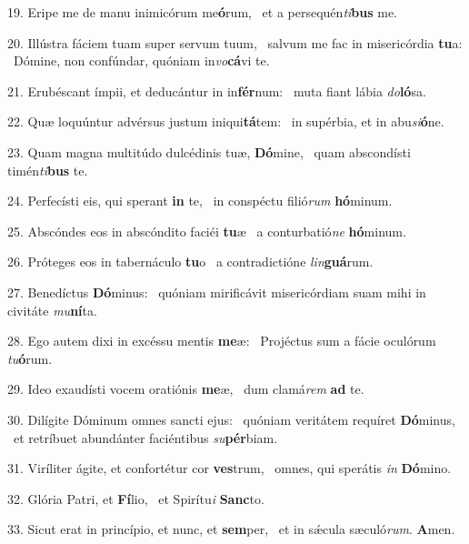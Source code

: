 19. Eripe me de manu inimicórum me\textbf{ó}rum, \ast\  et a persequén\textit{ti}\textbf{bus} me.\

20. Illústra fáciem tuam super servum tuum, \dag\  salvum me fac in misericórdia \textbf{tu}a: \ast\  Dómine, non confúndar, quóniam in\textit{vo}\textbf{cá}vi te.\

21. Erubéscant ímpii, et deducántur in in\textbf{fér}num: \ast\  muta fiant lábia \textit{do}\textbf{ló}sa.\

22. Quæ loquúntur advérsus justum iniqui\textbf{tá}tem: \ast\  in supérbia, et in abu\textit{si}\textbf{ó}ne.\

23. Quam magna multitúdo dulcédinis tuæ, \textbf{Dó}mine, \ast\  quam abscondísti timén\textit{ti}\textbf{bus} te.\

24. Perfecísti eis, qui sperant \textbf{in} te, \ast\  in conspéctu filió\textit{rum} \textbf{hó}minum.\

25. Abscóndes eos in abscóndito faciéi \textbf{tu}æ \ast\  a conturbatió\textit{ne} \textbf{hó}minum.\

26. Próteges eos in tabernáculo \textbf{tu}o \ast\  a contradictióne \textit{lin}\textbf{guá}rum.\

27. Benedíctus \textbf{Dó}minus: \ast\  quóniam mirificávit misericórdiam suam mihi in civitáte \textit{mu}\textbf{ní}ta.\

28. Ego autem dixi in excéssu mentis \textbf{me}æ: \ast\  Projéctus sum a fácie oculórum \textit{tu}\textbf{ó}rum.\

29. Ideo exaudísti vocem oratiónis \textbf{me}æ, \ast\  dum clamá\textit{rem} \textbf{ad} te.\

30. Dilígite Dóminum omnes sancti ejus: \dag\  quóniam veritátem requíret \textbf{Dó}minus, \ast\  et retríbuet abundánter faciéntibus \textit{su}\textbf{pér}biam.\

31. Viríliter ágite, et confortétur cor \textbf{ves}trum, \ast\  omnes, qui sperátis \textit{in} \textbf{Dó}mino.\

32. Glória Patri, et \textbf{Fí}lio, \ast\  et Spirítu\textit{i} \textbf{Sanc}to.\

33. Sicut erat in princípio, et nunc, et \textbf{sem}per, \ast\  et in sǽcula sæculó\textit{rum}. \textbf{A}men.\

